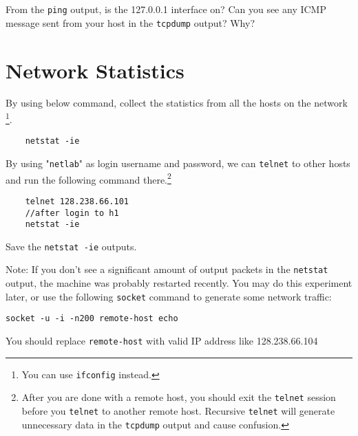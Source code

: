 \documentclass{UTNetLab}
\begin{document}
    \begin{report}
        \item From the \lstinline{ping} output, is the 127.0.0.1 interface on?
            Can you see any ICMP message sent from your host in the \lstinline{tcpdump} output?
            Why?
    \end{report}


\section{Network Statistics}
    By using below command, collect the statistics from all the hosts on the network
    \footnote{You can use \lstinline{ifconfig} instead.}.
    
    \begin{lstlisting}
    netstat -ie
    \end{lstlisting}
    
    
    By using "\lstinline{netlab}" as login username and password, we can \lstinline{telnet} to other hosts and run the following command there.\footnote{%
    	After you are done with a remote host, you should exit the \lstinline{telnet} session before you \lstinline{telnet} to another remote host.
    	Recursive \lstinline{telnet} will generate unnecessary data in the \lstinline{tcpdump} output and cause confusion.
    }
    
    \begin{lstlisting}
    telnet 128.238.66.101
    //after login to h1
    netstat -ie
    \end{lstlisting}
    
    Save the \lstinline{netstat -ie} outputs.

    Note: If you don’t see a significant amount of output packets in the \lstinline{netstat} output, the machine was probably restarted recently.
    You may do this experiment later, or use the following \lstinline{socket} command to generate some network traffic:
    
    \begin{lstlisting}[emph={remote-host}]
    socket -u -i -n200 remote-host echo
    \end{lstlisting}
    You should replace \lstinline{remote-host} with valid IP address like 128.238.66.104
    
\end{document}

